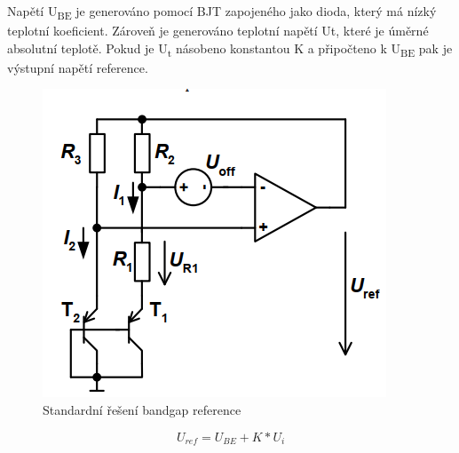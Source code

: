 Napětí U\textsubscript{BE} je generováno pomocí BJT zapojeného jako dioda, který má nízký teplotní koeficient. Zároveň je generováno teplotní napětí Ut, které je úměrné absolutní teplotě. Pokud je U\textsubscript{t} násobeno konstantou K a připočteno k U\textsubscript{BE} pak je výstupní napětí reference.
\begin{figure}[h]
   \begin{center}
     \includegraphics[scale=0.6]{images/BG2.png}
   \end{center}
   \caption{Standardní řešení bandgap reference}
\end{figure}

\begin{equation}
U_{ref} = U_{BE}+K*U_{i}
\end{equation}


